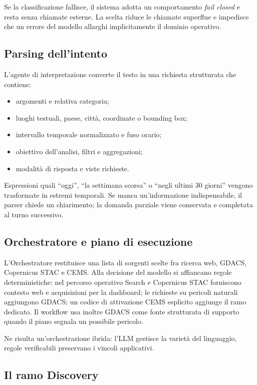 Se la classificazione fallisce, il sistema adotta un comportamento
\emph{fail closed} e resta senza chiamate esterne. La scelta riduce le chiamate
superflue e impedisce che un errore del modello allarghi implicitamente il
dominio operativo.

\subsection{Parsing dell'intento}

L'agente di interpretazione converte il testo in una richiesta strutturata che
contiene:

\begin{itemize}
    \item argomenti e relativa categoria;
    \item luoghi testuali, paese, città, coordinate o bounding box;
    \item intervallo temporale normalizzato e fuso orario;
    \item obiettivo dell'analisi, filtri e aggregazioni;
    \item modalità di risposta e viste richieste.
\end{itemize}

Espressioni quali ``oggi'', ``la settimana scorsa'' o ``negli ultimi 30
giorni'' vengono trasformate in estremi temporali. Se manca un'informazione
indispensabile, il parser chiede un chiarimento; la domanda parziale viene
conservata e completata al turno successivo.

\subsection{Orchestratore e piano di esecuzione}

L'Orchestratore restituisce una lista di sorgenti scelte fra ricerca web,
GDACS, Copernicus STAC e CEMS. Alla decisione del modello si affiancano regole
deterministiche: nel percorso operativo Search e Copernicus STAC forniscono
contesto web e acquisizioni per la dashboard; le richieste su pericoli naturali
aggiungono GDACS; un codice di attivazione CEMS esplicito aggiunge il ramo
dedicato. Il workflow usa inoltre GDACS come fonte strutturata di supporto
quando il piano segnala un possibile pericolo.

Ne risulta un'orchestrazione ibrida: l'LLM gestisce la varietà del linguaggio,
regole verificabili preservano i vincoli applicativi.

\subsection{Il ramo Discovery}
\label{subsec:discovery-workflow}

